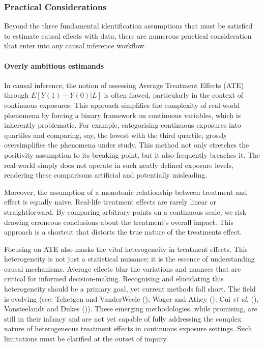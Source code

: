 \documentclass[
  singlecolumn,
  9pt]{article}
\let\oldparagraph\paragraph
\renewcommand{\paragraph}[1]{\oldparagraph{#1}\mbox{}}
\begin{document}
\subsubsection{Practical Considerations}\label{practical-considerations}

Beyond the three fundamental identification assumptions that must be
satisfied to estimate causal effects with data, there are numerous
practical consideration that enter into any causal inference workflow.

\paragraph{Overly ambitious estimands}\label{overly-ambitious-estimands}

In causal inference, the notion of assessing Average Treatment Effects
(ATE) through \(E[Y(1) - Y(0)|L]\) is often flawed, particularly in the
context of continuous exposures. This approach simplifies the complexity
of real-world phenomena by forcing a binary framework on continuous
variables, which is inherently problematic. For example, categorising
continuous exposures into quartiles and comparing, say, the lowest with
the third quartile, grossly oversimplifies the phenomena under study.
This method not only stretches the positivity assumption to its breaking
point, but it also frequently breaches it. The real-world simply does
not operate in such neatly defined exposure levels, rendering these
comparisons artificial and potentially misleading.

Moreover, the assumption of a monotonic relationship between treatment
and effect is equally naive. Real-life treatment effects are rarely
linear or straightforward. By comparing arbitrary points on a continuous
scale, we risk drawing erroneous conclusions about the treatment's
overall impact. This approach is a shortcut that distorts the true
nature of the treatments effect.

Focusing on ATE also masks the vital heterogeneity in treatment effects.
This heterogeneity is not just a statistical nuisance; it is the essence
of understanding causal mechanisms. Average effects blur the variations
and nuances that are critical for informed decision-making. Recognising
and elucidating this heterogeneity should be a primary goal, yet current
methods fall short. The field is evolving (see: Tchetgen and VanderWeele
(); Wager and Athey
(); Cui \emph{et al.}
(), Vansteelandt and Dukes
()). These emerging methodologies,
while promising, are still in their infancy and are not yet capable of
fully addressing the complex nature of heterogeneous treatment effects
in continuous exposure settings. Such limitations must be clarified at
the outset of inquiry.
\end{document}
